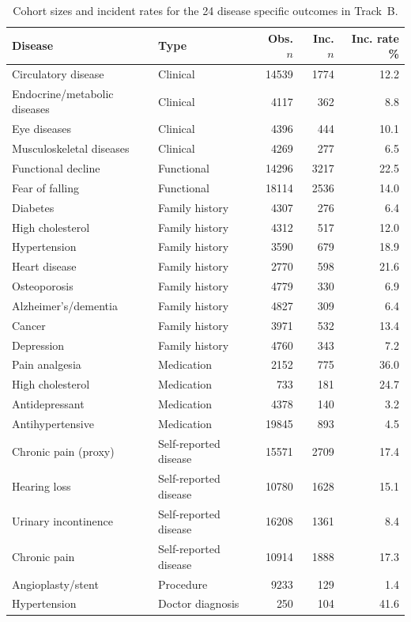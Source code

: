\begin{table}[htbp]
\centering
\caption{Cohort sizes and incident rates for the 24 disease specific outcomes in Track~B.}
\small
\begin{tabularx}{\textwidth}{X p{2.5cm} r r r}
\toprule
\textbf{Disease} & \textbf{Type} & \textbf{Obs. $n$} & \textbf{Inc. $n$} & \textbf{Inc. rate \%} \\
\midrule

Circulatory disease & Clinical & 14539 & 1774 & 12.2 \\
Endocrine/metabolic diseases & Clinical & 4117 & 362 & 8.8 \\
Eye diseases & Clinical & 4396 & 444 & 10.1 \\
Musculoskeletal diseases & Clinical & 4269 & 277 & 6.5 \\

Functional decline & Functional & 14296 & 3217 & 22.5 \\
Fear of falling & Functional & 18114 & 2536 & 14.0 \\

Diabetes & Family history & 4307 & 276 & 6.4 \\
High cholesterol & Family history & 4312 & 517 & 12.0 \\
Hypertension & Family history & 3590 & 679 & 18.9 \\
Heart disease & Family history & 2770 & 598 & 21.6 \\
Osteoporosis & Family history & 4779 & 330 & 6.9 \\
Alzheimer's/dementia & Family history & 4827 & 309 & 6.4 \\
Cancer & Family history & 3971 & 532 & 13.4 \\
Depression & Family history & 4760 & 343 & 7.2 \\

Pain analgesia & Medication & 2152 & 775 & 36.0 \\
High cholesterol & Medication & 733 & 181 & 24.7 \\
Antidepressant & Medication & 4378 & 140 & 3.2 \\
Antihypertensive & Medication & 19845 & 893 & 4.5 \\

Chronic pain (proxy) & Self-reported disease & 15571 & 2709 & 17.4 \\
Hearing loss & Self-reported disease & 10780 & 1628 & 15.1 \\
Urinary incontinence & Self-reported disease & 16208 & 1361 & 8.4 \\
Chronic pain & Self-reported disease & 10914 & 1888 & 17.3 \\

Angioplasty/stent & Procedure & 9233 & 129 & 1.4 \\

Hypertension & Doctor diagnosis & 250 & 104 & 41.6 \\

\bottomrule
\end{tabularx}
\end{table}